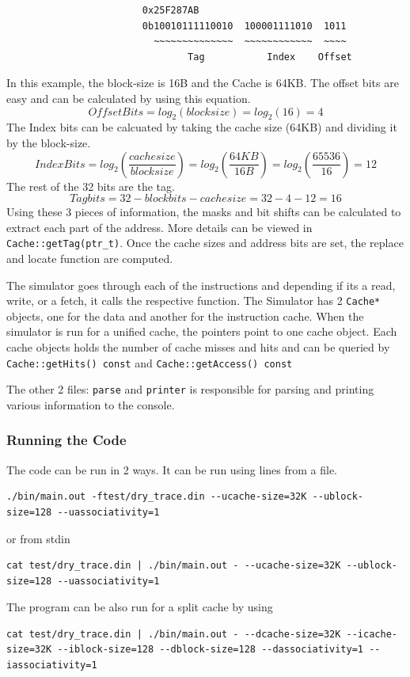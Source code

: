 \documentclass{article}
\begin{document}
            \begin{center}
            \begin{verbatim}
                        0x25F287AB
                        0b10010111110010  100001111010  1011
                          ~~~~~~~~~~~~~~  ~~~~~~~~~~~~  ~~~~
                                Tag           Index    Offset
            \end{verbatim}
            \end{center}
            In this example, the block-size is 16B and the Cache is 64KB. The offset bits are easy and can be calculated by using this equation.
            \[ Offset Bits = log_2(blocksize) = log_2(16) = 4  \]
            The Index bits can be calcuated by taking the cache size (64KB) and dividing it by the block-size.
            \[ Index Bits = log_2\left(\frac{cachesize}{blocksize}\right) = log_2\left(\frac{64KB}{16B}\right) = log_2\left(\frac{65536}{16}\right) = 12 \]
            The rest of the 32 bits are the tag.
            \[ Tag bits = 32 - blockbits - cachesize = 32 - 4 - 12 = 16 \]
            Using these 3 pieces of information, the masks and bit shifts can be calculated to extract each part of the address. More details can be viewed in \verb|Cache::getTag(ptr_t)|. Once the cache sizes and address bits are set, the replace and locate function are computed.
            \par
            The simulator goes through each of the instructions and depending if its a read, write, or a fetch, it calls the respective function. The Simulator has 2 \verb|Cache*| objects, one for the data and another for the instruction cache. When the simulator is run for a unified cache, the pointers point to one cache object. Each cache objects holds the number of cache misses and hits and can be queried by \verb|Cache::getHits() const| and \verb|Cache::getAccess() const|
            \par
            The other 2 files: \verb|parse| and \verb|printer| is responsible for parsing and printing various information to the console.
        \subsubsection{Running the Code}
            The code can be run in 2 ways. It can be run using lines from a file.
            \begin{lstlisting}
./bin/main.out -ftest/dry_trace.din --ucache-size=32K --ublock-size=128 --uassociativity=1
            \end{lstlisting}
            or from stdin
            \begin{lstlisting}
cat test/dry_trace.din | ./bin/main.out - --ucache-size=32K --ublock-size=128 --uassociativity=1
            \end{lstlisting}
            The program can be also run for a split cache by using
            \begin{lstlisting}
cat test/dry_trace.din | ./bin/main.out - --dcache-size=32K --icache-size=32K --iblock-size=128 --dblock-size=128 --dassociativity=1 --iassociativity=1

            \end{lstlisting}
\end{document}
